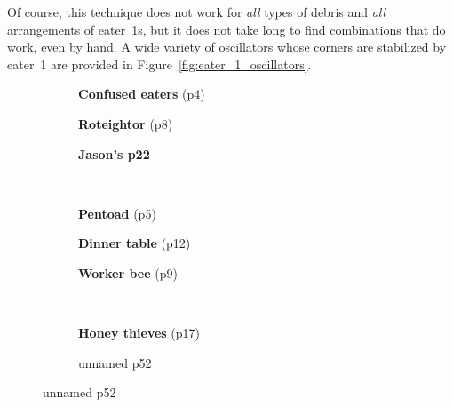 Of course, this technique does not work for \emph{all} types of debris and \emph{all} arrangements of eater~1s, but it does not take long to find combinations that do work, even by hand. A wide variety of oscillators whose corners are stabilized by eater~1 are provided in Figure~\ref{fig:eater_1_oscillators}.

\begin{figure}[!htb]
	\centering
	\begin{subfigure}{.3\textwidth}%
		\centering
		\caption{\textbf{Confused eaters} (p4)}
		\label{fig:confused_eaters}
	\end{subfigure}%
	\begin{subfigure}{.3\textwidth}%
		\centering
		\caption{\textbf{Roteightor} (p8)}
		\label{fig:roteightor}
	\end{subfigure}%
	\begin{subfigure}{.33\textwidth}%
		\centering
		\caption{\textbf{Jason's p22}}
		\label{fig:period_22}
	\end{subfigure} \\[0.2in]
	\begin{subfigure}{.3\textwidth}%
		\centering
		\caption{\textbf{Pentoad} (p5)}
		\label{fig:pentoad}
	\end{subfigure}%
	\begin{subfigure}{.3\textwidth}%
		\centering
		\caption{\textbf{Dinner table} (p12)}
		\label{fig:dinner_table}
	\end{subfigure}%
	\begin{subfigure}{.33\textwidth}%
		\centering
		\caption{\textbf{Worker bee} (p9)}
		\label{fig:worker_bee}
	\end{subfigure} \\[0.2in]
	\begin{subfigure}{.3\textwidth}%
		\centering
		\caption{\textbf{Honey thieves} (p17)}
		\label{fig:honey_thieves}
	\end{subfigure}%
	\begin{subfigure}{.3\textwidth}%
		\centering
		\caption{unnamed p52}
		\label{fig:period_52}

\end{subfigure}
\end{figure}
